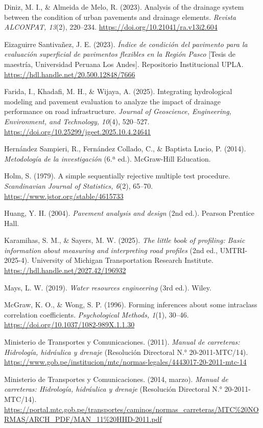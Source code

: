 \begin{list}{}
\item Diniz, M. I., \& Almeida de Melo, R. (2023). Analysis of the drainage system between the condition of urban pavements and drainage elements. \textit{Revista ALCONPAT, 13}(2), 220–234. \url{https://doi.org/10.21041/ra.v13i2.604}
\item Eizaguirre Santivañez, J. E. (2023). \textit{Índice de condición del pavimento para la evaluación superficial de pavimentos flexibles en la Región Pasco} [Tesis de maestría, Universidad Peruana Los Andes]. Repositorio Institucional UPLA. \url{https://hdl.handle.net/20.500.12848/7666}
\item Farida, I., Khadafi, M. H., \& Wijaya, A. (2025). Integrating hydrological modeling and pavement evaluation to analyze the impact of drainage performance on road infrastructure. \textit{Journal of Geoscience, Engineering, Environment, and Technology, 10}(4), 520–527. \url{https://doi.org/10.25299/jgeet.2025.10.4.24641}
\item Hernández Sampieri, R., Fernández Collado, C., \& Baptista Lucio, P. (2014). \textit{Metodología de la investigación} (6.ª ed.). McGraw-Hill Education.
\item Holm, S. (1979). A simple sequentially rejective multiple test procedure. \textit{Scandinavian Journal of Statistics, 6}(2), 65–70. \url{https://www.jstor.org/stable/4615733}
\item Huang, Y. H. (2004). \textit{Pavement analysis and design} (2nd ed.). Pearson Prentice Hall.
\item Karamihas, S. M., \& Sayers, M. W. (2025). \textit{The little book of profiling: Basic information about measuring and interpreting road profiles} (2nd ed., UMTRI-2025-4). University of Michigan Transportation Research Institute. \url{https://hdl.handle.net/2027.42/196932}
\item Mays, L. W. (2019). \textit{Water resources engineering} (3rd ed.). Wiley.
\item McGraw, K. O., \& Wong, S. P. (1996). Forming inferences about some intraclass correlation coefficients. \textit{Psychological Methods, 1}(1), 30–46. \url{https://doi.org/10.1037/1082-989X.1.1.30}
\item Ministerio de Transportes y Comunicaciones. (2011). \textit{Manual de carreteras: Hidrología, hidráulica y drenaje} (Resolución Directoral N.° 20-2011-MTC/14). \url{https://www.gob.pe/institucion/mtc/normas-legales/4443017-20-2011-mtc-14}
\item Ministerio de Transportes y Comunicaciones. (2014, marzo). \textit{Manual de carreteras: Hidrología, hidráulica y drenaje} (Resolución Directoral N.° 20-2011-MTC/14). \url{https://portal.mtc.gob.pe/transportes/caminos/normas_carreteras/MTC%20NORMAS/ARCH_PDF/MAN_11%20HHD-2011.pdf}

\end{list}
